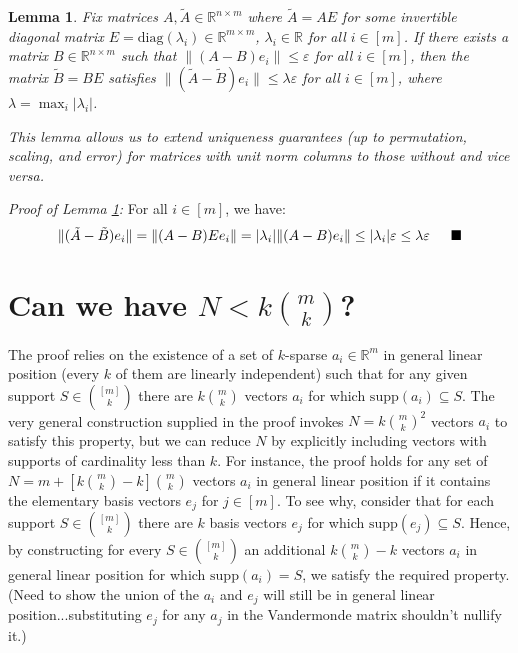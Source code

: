 \documentclass[journal,onecolumn]{IEEEtran}
\newtheorem{lemma}{Lemma}
\begin{document}

\begin{lemma}\label{NormalizedDictionaryLemma}
Fix matrices $A, \tilde{A} \in \mathbb{R}^{n \times m}$ where $\tilde{A} = AE$ for some invertible diagonal matrix $E = \text{diag}(\lambda_i) \in \mathbb{R}^{m \times m}$, $\lambda_i \in \mathbb{R}$ for all $i \in [m]$. If there exists a matrix $B \in \mathbb{R}^{n \times m}$ such that $\|(A - B)e_i\| \leq \varepsilon$ for all $i \in [m]$, then the matrix $\tilde{B} = BE$ satisfies $\|(\tilde{A} - \tilde{B})e_i\| \leq \lambda \varepsilon$ for all $i \in [m]$, where $\lambda = \max_i |\lambda_i|$.

This lemma allows us to extend uniqueness guarantees (up to permutation, scaling, and error) for matrices with unit norm columns to those without and vice versa. 
\end{lemma}

\emph{Proof of Lemma \ref{NormalizedDictionaryLemma}:} For all $i \in [m]$, we have:
\begin{align*}
\|(\tilde{A} - \tilde{B})e_i\| = \|(A-B)Ee_i\| = |\lambda_i| \|(A-B)e_i\| \leq |\lambda_i| \varepsilon \leq \lambda \varepsilon 
\indent \blacksquare
\end{align*}


\section{Can we have $N < k{m \choose k}$?}

The proof relies on the existence of a set of $k$-sparse $a_i \in \mathbb{R}^m$ in general linear position (every $k$ of them are linearly independent) such that for any given support $S \in {[m] \choose k}$ there are $k {m \choose k}$ vectors $a_i$ for which $\text{supp}(a_i) \subseteq S$. The very general construction supplied in the proof invokes $N = k {m \choose k}^2$ vectors $a_i$ to satisfy this property, but we can reduce $N$ by explicitly including vectors with supports of cardinality less than $k$. For instance, the proof holds for any set of $N = m + \left[ k{m \choose k} - k\right]{m \choose k}$ vectors $a_i$ in general linear position if it contains the elementary basis vectors $e_j$ for $j \in [m]$. To see why, consider that for each support $S \in {[m] \choose k}$ there are $k$ basis vectors $e_j$  for which $\text{supp}(e_j) \subseteq S$. Hence, by constructing for every $S \in {[m] \choose k}$ an additional $k{m \choose k} - k$ vectors $a_i$ in general linear position for which $\text{supp}(a_i) = S$, we satisfy the required property. (Need to show the union of the $a_i$ and $e_j$ will still be in general linear position...substituting $e_j$ for any $a_j$ in the Vandermonde matrix shouldn't nullify it.)
\end{document}
